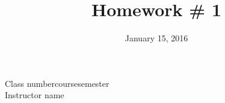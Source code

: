 \documentclass[12pt, letterpaper]{article}
\title{Homework \# 1}
\author{\yourName}
\date{January 15, 2016}
\newcommand{\classNumber}{Class number}
\newcommand{\instructor}{Instructor name}
\newcommand{\className}{course}
\newcommand{\semester}{semester}
\begin{document}
\begin{titlepage}
\clearpage\maketitle
\centering
\vspace{2.5cm}
\classNumber \qquad \className \qquad \semester\\
\vspace{0.5cm}
\instructor
\thispagestyle{empty}
\end{titlepage}

\section{}
\section{}
\section{}
\section{}
\section{}
\end{document}
